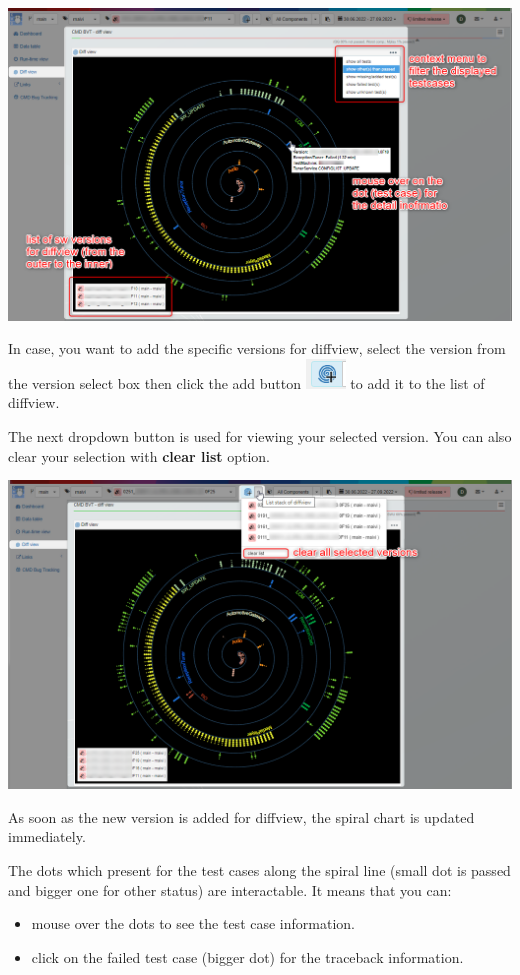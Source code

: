 \includegraphics[width=1\linewidth]{./pictures/diffview/default_detail.png}

In case, you want to add the specific versions for diffview, select the version
from the version select box then click the add button 
\includegraphics{./pictures/diffview/add_button.png} to add it to the list of 
diffview. 

The next dropdown button is used for viewing your selected version.
You can also clear your selection with \textbf{clear list} option.

\includegraphics[width=1\linewidth]{./pictures/diffview/selected_version.png}

As soon as the new version is added for diffview, the spiral chart is updated 
immediately.

The dots which present for the test cases along the spiral line (small dot is 
passed and bigger one for other status) are interactable. It means that you can:
\begin{itemize}
   \item mouse over the dots to see the test case information.
   \item click on the failed test case (bigger dot) for the traceback 
         information.
\end{itemize}

